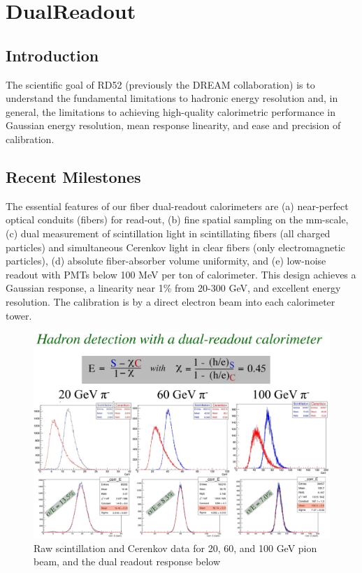 \section{DualReadout}

\subsection{Introduction}
The scientific goal of RD52 (previously the DREAM collaboration) is to understand the fundamental limitations to hadronic energy resolution and, in general, the limitations to achieving high-quality calorimetric performance in Gaussian energy resolution, mean response linearity, and ease and precision of calibration.
\subsection{Recent Milestones}
The essential features of our fiber dual-readout calorimeters are (a) near-perfect optical conduits (fibers) for read-out, (b) fine spatial sampling on the mm-scale, (c) dual measurement of scintillation light in scintillating fibers (all charged particles) and simultaneous Cerenkov light in clear fibers (only electromagnetic particles), (d) absolute fiber-absorber volume uniformity, and (e) low-noise readout with PMTs below 100 MeV per ton of calorimeter. This design achieves a Gaussian response, a linearity near 1\% from 20-300 GeV, and excellent energy resolution. The calibration is by a direct electron beam into each calorimeter tower.
\begin{figure}
\centering
\includegraphics[width=\linewidth]{Calorimeter/DualReadout/Res-pion-20-60-100GeV.jpg}
\caption{Raw scintillation and Cerenkov data for 20, 60, and 100 GeV pion beam, and the dual readout response below}
\label{fig:DualReadout:PionResponse}
\end{figure}

